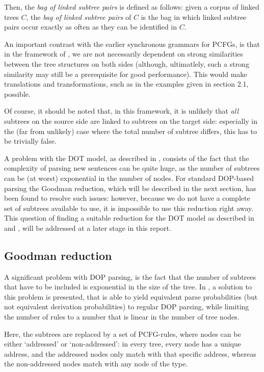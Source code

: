 \documentclass[a4paper]{article}
\theoremstyle{definition}
\begin{document}
Then, the \emph{bag of linked subtree pairs} is defined as follows: given a corpus of linked trees $C$, the \emph{bag of linked subtree pairs} of $C$ is the bag in which linked subtree pairs occur exactly as often as they can be identified in $C$.

An important contrast with the earlier synchronous grammars for PCFGs, is that in the framework of \cite{Po}, we are not necessarily dependent on strong similarities between the tree structures on both sides (although, ultimatlely, such a strong similarity may still be a prerequisite for good performance). This would make translations and transformations, such as in the examples given in section 2.1, possible.

Of course, it should be noted that, in this framework, it is unlikely that \emph{all} subtrees on the source side are linked to subtrees on the target side: especially in the (far from unlikely) case where the total number of subtree differs, this has to be trivially false.

A problem with the DOT model, as described in \cite{Po}, consists of the fact that the complexity of parsing new sentences can be quite huge, as the number of subtrees can be (at worst) exponential in the number of nodes. For standard DOP-based parsing the Goodman reduction, which will be described in the next section, has been found to resolve such issues: however, because we do not have a complete set of subtrees available to use, it is impossible to use this reduction right away. This question of finding a suitable reduction for the DOT model as described in \cite{Po} and \cite{Po2}, will be addressed at a later stage in this report.

\subsection{Goodman reduction}

A significant problem with DOP parsing, is the fact that the number of subtrees that have to be included is exponential in the size of the tree. In \cite{Go}, a solution to this problem is presented, that is able to yield equivalent parse probabilities (but not equivalent derivation probabilities) to regular DOP parsing, while limiting the number of rules to a number that is linear in the number of tree nodes.

Here, the subtrees are replaced by a set of PCFG-rules, where nodes can be either `addressed' or `non-addressed': in every tree, every node has a unique address, and the addressed nodes only match with that specific address, whereas the non-addressed nodes match with any node of the type.
\end{document}
